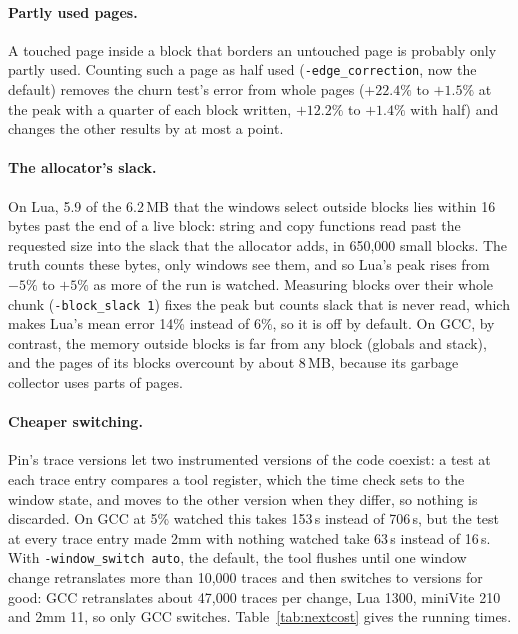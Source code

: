 \documentclass[11pt]{article}
\newcommand{\knob}[1]{\texttt{-#1}}
\newcommand{\tabref}[1]{Table~\ref{#1}}
\begin{document}
\paragraph{Partly used pages.} A touched page inside a block that borders an untouched page is probably only partly used. Counting such a page as half used (\knob{edge\_correction}, now the default) removes the churn test's error from whole pages ($+22.4\%$ to $+1.5\%$ at the peak with a quarter of each block written, $+12.2\%$ to $+1.4\%$ with half) and changes the other results by at most a point.

\paragraph{The allocator's slack.} On Lua, 5.9 of the 6.2\,MB that the windows select outside blocks lies within 16 bytes past the end of a live block: string and copy functions read past the requested size into the slack that the allocator adds, in 650{,}000 small blocks. The truth counts these bytes, only windows see them, and so Lua's peak rises from $-5\%$ to $+5\%$ as more of the run is watched. Measuring blocks over their whole chunk (\knob{block\_slack 1}) fixes the peak but counts slack that is never read, which makes Lua's mean error 14\% instead of 6\%, so it is off by default. On GCC, by contrast, the memory outside blocks is far from any block (globals and stack), and the pages of its blocks overcount by about 8\,MB, because its garbage collector uses parts of pages.

\paragraph{Cheaper switching.} Pin's trace versions let two instrumented versions of the code coexist: a test at each trace entry compares a tool register, which the time check sets to the window state, and moves to the other version when they differ, so nothing is discarded. On GCC at 5\% watched this takes 153\,s instead of 706\,s, but the test at every trace entry made 2mm with nothing watched take 63\,s instead of 16\,s. With \knob{window\_switch auto}, the default, the tool flushes until one window change retranslates more than 10{,}000 traces and then switches to versions for good: GCC retranslates about 47{,}000 traces per change, Lua 1300, miniVite 210 and 2mm 11, so only GCC switches. \tabref{tab:nextcost} gives the running times.
\end{document}

